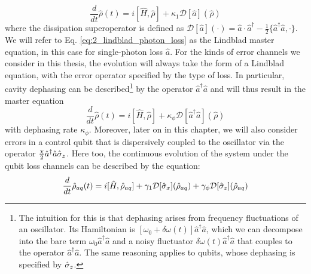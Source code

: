 \begin{equation}
    \frac{d}{dt}\hat{\rho}(t) = i[\hat{H}, \hat{\rho}] + \kappa_1\mathcal{D}[\hat{a}](\hat{\rho})
    \label{eq:2_lindblad_photon_loss}
\end{equation}
where the dissipation superoperator is defined as $\mathcal{D}[\hat{a}](\cdot) = \hat{a}\cdot\hat{a}^\dagger - \frac{1}{2}\{\hat{a}^\dagger\hat{a}, \cdot\}$. We will refer to Eq. \eqref{eq:2_lindblad_photon_loss} as the Lindblad master equation, in this case for single-photon loss $\hat{a}$. For the kinds of error channels we consider in this thesis, the evolution will always take the form of a Lindblad equation, with the error operator specified by the type of loss. In particular, cavity dephasing can be described\footnote{The intuition for this is that dephasing arises from frequency fluctuations of an oscillator. Its Hamiltonian is $[\omega_0 + \delta \omega(t)]\hat{a}^\dagger\hat{a}$, which we can decompose into the bare term $\omega_0 \hat{a}^\dagger\hat{a}$ and a noisy fluctuator $\delta \omega(t)\hat{a}^\dagger\hat{a}$ that couples to the operator $\hat{a}^\dagger\hat{a}$. The same reasoning applies to qubits, whose dephasing is specified by $\hat{\sigma}_z$.} by the operator $\hat{a}^\dagger\hat{a}$ and will thus result in the master equation 
\begin{equation}
    \frac{d}{dt}\hat{\rho}(t) = i[\hat{H}, \hat{\rho}] + \kappa_\phi\mathcal{D}[\hat{a}^\dagger\hat{a}](\hat{\rho})
\end{equation}
with dephasing rate $\kappa_\phi$. Moreover, later on in this chapter, we will also consider errors in a control qubit that is dispersively coupled to the oscillator via the operator $\frac{\chi}{2}\hat{a}^\dagger\hat{a}\hat{\sigma}_z$. Here too, the continuous evolution of the system under the qubit loss channels can be described by the equation:
\begin{equation}
    \frac{d}{dt}\hat{\rho}_{aq}(t) = i[\hat{H}, \hat{\rho}_{aq}] + \gamma_1\mathcal{D}[\hat{\sigma}_x](\hat{\rho}_{aq}) + \gamma_\phi\mathcal{D}[\hat{\sigma}_z](\hat{\rho}_{aq})
\end{equation}
